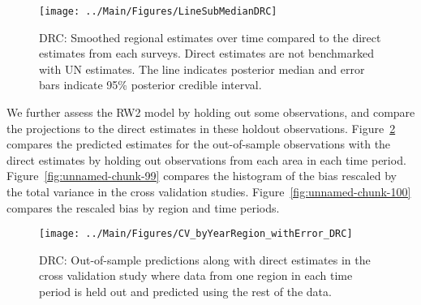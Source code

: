 \documentclass[12pt]{article}\usepackage[]{graphicx}\usepackage[]{color}
\newenvironment{knitrout}{}{} %
\begin{document}
\begin{knitrout}
\color{fgcolor}\begin{figure}[bht]

{\centering \texttt{[image: ../Main/Figures/LineSubMedianDRC]} 

}

\caption[DRC]{DRC: Smoothed regional estimates over time compared to the direct estimates from each surveys. Direct estimates are not benchmarked with UN estimates. The line indicates posterior median and error bars indicate 95\% posterior credible interval.}\label{fig:unnamed-chunk-97}
\end{figure}


\end{knitrout}
We further assess the RW2 model by holding out some observations, and compare the projections to the direct estimates in these holdout observations. Figure~\ref{fig:unnamed-chunk-98} compares the predicted estimates for the out-of-sample observations  with the direct estimates by holding out observations from each area in each time period.  Figure~\ref{fig:unnamed-chunk-99} compares the histogram of the bias rescaled by the total variance in the cross validation studies. Figure~\ref{fig:unnamed-chunk-100} compares the rescaled bias by region and time periods.



 
\begin{knitrout}
\color{fgcolor}\begin{figure}[bht]

{\centering \texttt{[image: ../Main/Figures/CV\_byYearRegion\_withError\_DRC]} 

}

\caption[DRC]{DRC: Out-of-sample predictions along with direct estimates in the cross validation study where data from one region in each time period is held out and predicted using the rest of the data.}\label{fig:unnamed-chunk-98}
\end{figure}


\end{knitrout}
\end{document}
